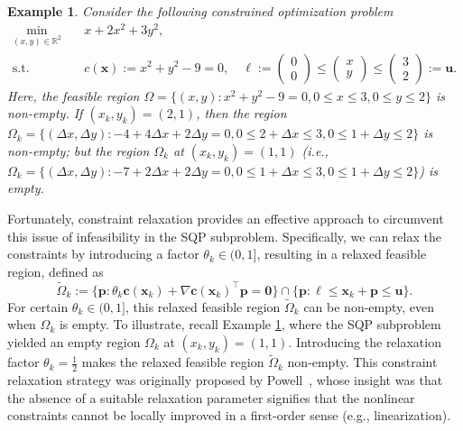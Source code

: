 \documentclass[aos]{imsart}
\numberwithin{equation}{section}
\theoremstyle{plain}
\newtheorem{example}{Example}
\begin{document}
\begin{example}
\label{exmp1}
Consider the following constrained optimization problem
\begin{equation}
    \begin{split}
        \min_{(x,y) \in \mathbb{R}^{2}} & \hspace{1em} x + 2x^2 + 3y^2,\\
        \text{s.t.} & \hspace{1em} c(\bm{x}) := x^2 + y^2 -9 =  0,\quad   \bm{\ell} := \left(\begin{array}{c}
             0  \\
             0
        \end{array} \right) \leq \left(\begin{array}{c}
             x  \\
             y 
        \end{array} \right) \leq \left(\begin{array}{c}
             3  \\
             2
        \end{array} \right) := \bm{u}.
    \end{split}
\end{equation}
Here, the feasible region $\Omega = \{(x,y): x^2 + y^2 -9 =0, 0 \leq x \leq 3, 0 \leq y \leq 2\}$ is non-empty. If $(x_k,y_k) = (2,1)$, then the region $\Omega_k = \{(\Delta x,\Delta y): -4 + 4\Delta x + 2\Delta y =0, 0 \leq 2+\Delta x \leq 3, 0 \leq 1+\Delta y \leq 2\}$ is non-empty; but the region $\Omega_k$ at $(x_k,y_k) = (1,1)$ (i.e., $\Omega_k = \{(\Delta x,\Delta y): -7 + 2 \Delta x + 2 \Delta y = 0, 0 \leq 1 + \Delta x \leq 3, 0 \leq 1 + \Delta y \leq 2 \}$) is empty. 
\end{example}


Fortunately, constraint relaxation provides an effective approach to circumvent this issue of infeasibility in the SQP subproblem. Specifically, we can relax the constraints by introducing a factor $\theta_k \in (0,1]$, resulting in a relaxed feasible region, defined as
\begin{equation*}
    \widetilde{\Omega}_k := \{\bm{p}: \theta_k \bm{c}(\bm{x}_{k})+\nabla \bm{c}(\bm{x}_k)^{\top}\bm{p}=\bm{0}\} \cap \{\bm{p}: \bm{\ell} \leq \bm{x}_k + \bm{p} \leq \bm{u}\}.
\end{equation*}
For certain $\theta_k \in (0,1]$, this relaxed feasible region $ \widetilde{\Omega}_k$ can be non-empty, even when $\Omega_k$ is empty.
To illustrate, recall Example \ref{exmp1}, where the SQP subproblem yielded an empty region $\Omega_k$ at $(x_k,y_k) = (1,1)$. 
Introducing the relaxation factor $\theta_k = \frac{1}{2}$ makes the relaxed feasible region $\widetilde{\Omega}_k$ non-empty. 
This constraint relaxation strategy was originally proposed by Powell~\cite{powell2006fast}, whose insight was that the absence of a suitable relaxation parameter signifies that the nonlinear constraints cannot be locally improved in a first-order sense (e.g., linearization). 
\end{document}
